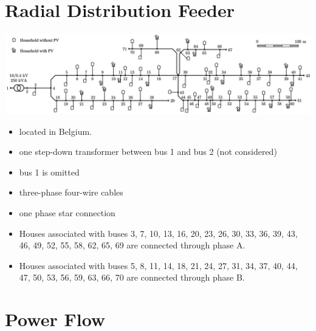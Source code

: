 \documentclass[
]{book}
\providecommand{\tightlist}{%
  \setlength{\itemsep}{0pt}\setlength{\parskip}{0pt}}
\begin{document}
\hypertarget{RDF}{%
\chapter{Radial Distribution Feeder}\label{RDF}}

\includegraphics{../Pictures/case70true.png}

\begin{itemize}
\tightlist
\item
  located in Belgium.
\item
  one step-down transformer between bus 1 and bus 2 (not considered)
\item
  bus 1 is omitted
\item
  three-phase four-wire cables
\item
  one phase star connection
\item
  Houses associated with buses 3, 7, 10, 13, 16, 20, 23, 26, 30, 33, 36, 39,
  43, 46, 49, 52, 55, 58, 62, 65, 69 are connected through phase A.
\item
  Houses associated with buses 5, 8, 11, 14, 18, 21, 24, 27, 31, 34, 37, 40,
  44, 47, 50, 53, 56, 59, 63, 66, 70 are connected through phase B.
\end{itemize}

\hypertarget{power-flow}{%
\chapter{Power Flow}\label{power-flow}}

  
\end{document}
